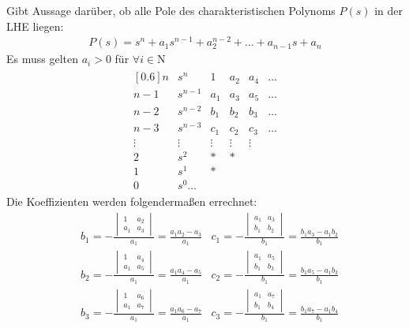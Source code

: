 \begin{tcolorbox}[colback=white!10!white,colframe=green!30!black,title=Routh Kriterium] 
	Gibt Aussage darüber, ob alle Pole des charakteristischen Polynoms $P(s)$ in der LHE liegen:
	\begin{align*}
	P(s) = s^n + a_1s^{n-1}+a_2^{n-2}+\ldots + a_{n-1}s+a_n
	\end{align*}
	Es muss gelten $a_i > 0$ für $\forall i \in \mathrm{N}$
	\begin{align*}
		\begin{matrix}[0.6]
		n & s^n & 1 & a_2 & a_4 & \ldots \\
		n-1 & s^{n-1} & a_1 & a_3 & a_5 & \ldots \\
		n-2 & s^{n-2} & b_1 & b_2 & b_3 & \ldots \\		
		n-3 & s^{n-3} & c_1 & c_2 & c_3 & \ldots \\
		\vdots & \vdots & \vdots & \vdots & \vdots  \\
		2 & s^2 & * & *  \\
		1 & s^1 & * \\
		0 & s^0 \ldots 
		\end{matrix}
	\end{align*}
	Die Koeffizienten werden folgendermaßen errechnet:
	\begin{align*}
		& b_1 = -\frac{\begin{vmatrix}
			1 & a_2 \\ a_1 & a_3
			\end{vmatrix}}{a_1} = \frac{a_1a_2-a_3}{a_1} & c_1 = -\frac{\begin{vmatrix}
			a_1 & a_3 \\ b_1 & b_2
			\end{vmatrix}}{b_1} = \frac{b_1a_3-a_1b_2}{b_1}\\
		& b_2 = -\frac{\begin{vmatrix}
			1 & a_4 \\ a_1 & a_5
			\end{vmatrix}}{a_1} = \frac{a_1a_4-a_5}{a_1} & c_2 = -\frac{\begin{vmatrix}
			a_1 & a_5 \\ b_1 & b_3
			\end{vmatrix}}{b_1} = \frac{b_1a_5-a_1b_3}{b_1}\\
		& b_3 = -\frac{\begin{vmatrix}
			1 & a_6 \\ a_1 & a_7
			\end{vmatrix}}{a_1} = \frac{a_1a_6-a_7}{a_1} & c_3 = -\frac{\begin{vmatrix}
			a_1 & a_7 \\ b_1 & b_4
			\end{vmatrix}}{b_1} = \frac{b_1a_7-a_1b_4}{b_1}
	\end{align*}
	

\end{tcolorbox}
